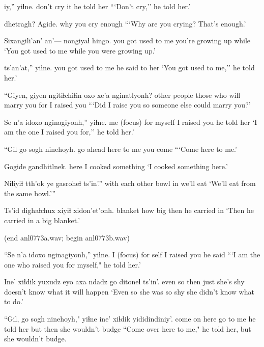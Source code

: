 \documentclass[12pt]{article}
\begin{document}
 iy,'' yiɬne.
{don't cry}     it {he told her}
\glt ```Don't cry,'' he told her.'
\glend

 dhetragh?     Agide. 
why {you cry} enough
\glt ```Why are you crying? That's enough.'
\glend

\gll Sixangili'an'   an'---        nongiyaɬ hingo.
{you got used to me} {} {you're growing up} while
\glt `You got used to me while you were growing up.'
\glend

     ts'an'at,'' yiɬne.
{you got used to me}  {}      {he said to her}
\glt `You got used to me,'' he told her.'
\glend

\gll ``Giyen,       giyen ngitiɬchiɬin   oxo   xe'a  nginatlyonh?
{other people} {}    {those who will marry you} {for} {} {I raised you}
\glt ```Did I raise you so someone else could marry you?'
\glend

\gll Se n'a   idoxo     nginagiyonh,''  yiɬne.
me {(focus)}  {for myself} {I raised you} {he told her}
\glt `I am the one I raised you for,'' he told her.'
\glend

\gll ``Gil      go   sogh  ninehoyh.
{go ahead} here {to me} {you come}
\glt ```Come here to me.'
\glend

\gll Gogide gandhitlnek. 
here   {I cooked something}
\glt `I cooked something here.'
\glend

\gll Niɬiyiɬ tth'ok ye gasroheɬ ts'in'.''
{with each other} bowl  in {we'll eat}
\glt `We'll eat from the same bowl.'''
\glend

\gll Ts'id   dighaɬchux xiyiɬ xidon'et'onh.
blanket {how big} then {he carried in}
\glt `Then he carried in a big blanket.'
\glend

(end anl0773a.wav; begin anl0773b.wav)


\gll ``Se n'a  idoxo    nginagiyonh,''  yiɬne.
I  {(focus)}     {for self} {I raised you} {he said}
\glt ```I am the one who raised you for myself," he told her.'
\glend

\gll Ine'    xiɬdik yuxudz {eyo axa}   {ndadz go}   ditoneɬ        ts'in'.
{even so} then   just   {she's shy} {doesn't know what} {it will happen}
\glt `Even so she was so shy she didn't know what to do.'
\glend

\gll ``Gil,   go   {sogh ninehoyh,"} yiɬne ine'  xiɬdik yididindiniy'.
{come on} here {go to me}     {he told her} but then   {she wouldn't budge}
\glt  ``Come over here to me," he told her, but she wouldn't budge.
\glend
\end{document}
